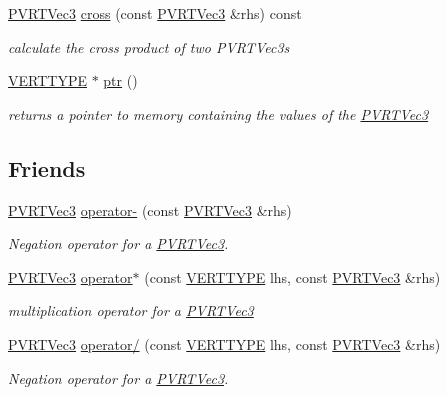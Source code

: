 \begin{DoxyCompactItemize}
\hyperlink{struct_p_v_r_t_vec3}{P\+V\+R\+T\+Vec3} \hyperlink{struct_p_v_r_t_vec3_ae5c0781b20ea9945ba92567e77782b92}{cross} (const \hyperlink{struct_p_v_r_t_vec3}{P\+V\+R\+T\+Vec3} \&rhs) const 
\begin{DoxyCompactList}\small\item\em calculate the cross product of two P\+V\+R\+T\+Vec3s \end{DoxyCompactList}\item 
\hyperlink{group___a_p_i___o_g_l_e_s_ga06da457b7d3e93368ab904f89e1396be}{V\+E\+R\+T\+T\+Y\+P\+E} $\ast$ \hyperlink{struct_p_v_r_t_vec3_a9a19fb9bc354e97e35e08b1af7cc55ee}{ptr} ()
\begin{DoxyCompactList}\small\item\em returns a pointer to memory containing the values of the \hyperlink{struct_p_v_r_t_vec3}{P\+V\+R\+T\+Vec3} \end{DoxyCompactList}\end{DoxyCompactItemize}
\subsection*{Friends}
\begin{DoxyCompactItemize}
\item 
\hyperlink{struct_p_v_r_t_vec3}{P\+V\+R\+T\+Vec3} \hyperlink{struct_p_v_r_t_vec3_a75fdff891d72339258cab68c78ea3831}{operator-\/} (const \hyperlink{struct_p_v_r_t_vec3}{P\+V\+R\+T\+Vec3} \&rhs)
\begin{DoxyCompactList}\small\item\em Negation operator for a \hyperlink{struct_p_v_r_t_vec3}{P\+V\+R\+T\+Vec3}. \end{DoxyCompactList}\item 
\hyperlink{struct_p_v_r_t_vec3}{P\+V\+R\+T\+Vec3} \hyperlink{struct_p_v_r_t_vec3_aef62899282148154ef78b5d39abe8a2c}{operator$\ast$} (const \hyperlink{group___a_p_i___o_g_l_e_s_ga06da457b7d3e93368ab904f89e1396be}{V\+E\+R\+T\+T\+Y\+P\+E} lhs, const \hyperlink{struct_p_v_r_t_vec3}{P\+V\+R\+T\+Vec3} \&rhs)
\begin{DoxyCompactList}\small\item\em multiplication operator for a \hyperlink{struct_p_v_r_t_vec3}{P\+V\+R\+T\+Vec3} \end{DoxyCompactList}\item 
\hyperlink{struct_p_v_r_t_vec3}{P\+V\+R\+T\+Vec3} \hyperlink{struct_p_v_r_t_vec3_a0c8f0fb146566c83b48e2cfa965475c9}{operator/} (const \hyperlink{group___a_p_i___o_g_l_e_s_ga06da457b7d3e93368ab904f89e1396be}{V\+E\+R\+T\+T\+Y\+P\+E} lhs, const \hyperlink{struct_p_v_r_t_vec3}{P\+V\+R\+T\+Vec3} \&rhs)
\begin{DoxyCompactList}\small\item\em Negation operator for a \hyperlink{struct_p_v_r_t_vec3}{P\+V\+R\+T\+Vec3}. \end{DoxyCompactList}\end{DoxyCompactItemize}
